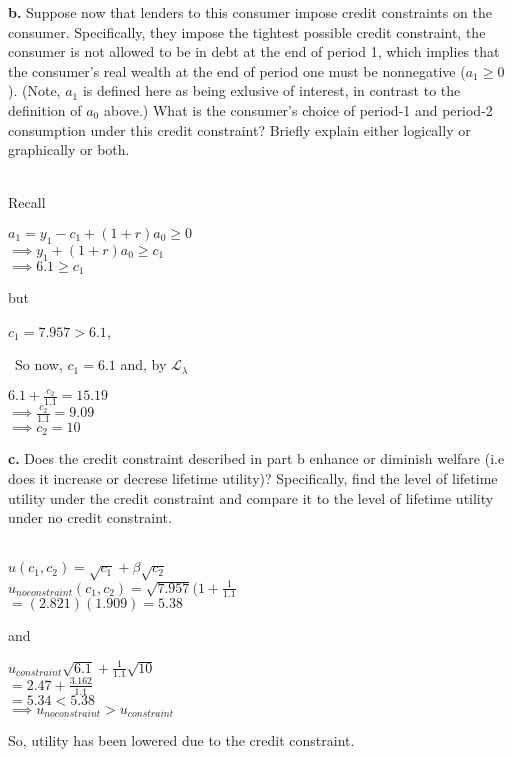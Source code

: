 \documentclass[11pt]{SelfArxOneColBMN}
\begin{document}
\indent \textbf{b. }Suppose now that lenders to this consumer impose credit constraints on the consumer. Specifically, they impose the tightest possible credit constraint, the consumer is not allowed to be in debt at the end of period 1, which implies that the consumer's real wealth at the end of period one must be nonnegative ($a_1 \geq 0$). (Note, $a_1$ is defined here as being exlusive of interest, in contrast to the definition of $a_0$ above.) What is the consumer's choice  of period-1 and period-2 consumption under this credit constraint? Briefly explain either logically or graphically or both.\\
\\
\begin{solution}
  \noindent Recall\\
  \begin{center}
    $a_1 = y_1 - c_1 + (1 + r)a_0 \geq 0$\\
    $\implies y_1 + (1 + r)a_0 \geq c_1$\\
    $\implies 6.1 \geq c_1$
  \end{center}
  but
  \begin{center}
    $c_1 = 7.957 > 6.1$,
  \end{center}\
  So now, $c_1 = 6.1$ and, by $\mathcal{L}_\lambda$
  \begin{center}
    $6.1 + \frac{c_2}{1.1} = 15.19$\\
    $\implies \frac{c_2}{1.1} = 9.09$\\
    $\implies c_2 = 10$
  \end{center}
\end{solution}
\indent \textbf{c.} Does the credit constraint described in part b enhance or diminish welfare (i.e does it increase or decrese lifetime utility)? Specifically, find the level of lifetime utility under the credit constraint and compare it to the level of lifetime utility under no credit constraint.\\
\\
\begin{solution}
  \begin{center}
    $u(c_1,c_2) = \sqrt{c_1} + \beta\sqrt{c_2}$\\
    $u_{no constraint}(c_1,c_2) = \sqrt{7.957}(1 + \frac{1}{1.1}$\\
    $= (2.821)(1.909) = 5.38$\\
  \end{center}
  and
  \begin{center}
    $u_{constraint} \sqrt{6.1} + \frac{1}{1.1}\sqrt{10}$\\
    $= 2.47 + \frac{3.162}{1.1}$\\
    $= 5.34 < 5.38$\\
    $\implies u_{no constraint} > u_{constraint}$
  \end{center}
  So, utility has been lowered due to the credit constraint.
\end{solution}
\end{document}
